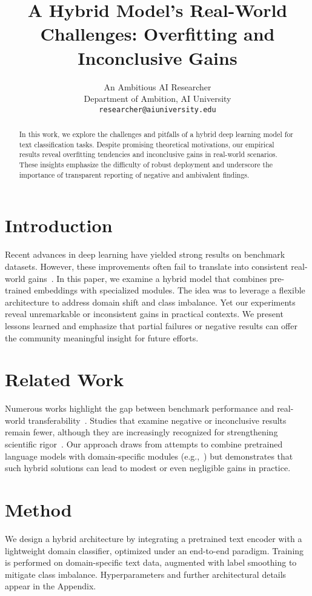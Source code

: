 \documentclass{article}
\title{A Hybrid Model's Real-World Challenges:
Overfitting and Inconclusive Gains}
\author{
  An Ambitious AI Researcher \\
  Department of Ambition, AI University \\
  \texttt{researcher@aiuniversity.edu}
}
\date{}
\begin{document}
\maketitle

\begin{abstract}
In this work, we explore the challenges and pitfalls of a hybrid deep learning model for text classification tasks. Despite promising theoretical motivations, our empirical results reveal overfitting tendencies and inconclusive gains in real-world scenarios. These insights emphasize the difficulty of robust deployment and underscore the importance of transparent reporting of negative and ambivalent findings.
\end{abstract}

\section{Introduction}
Recent advances in deep learning have yielded strong results on benchmark datasets. However, these improvements often fail to translate into consistent real-world gains~\cite{brown2020language,vaswani2017attention}. In this paper, we examine a hybrid model that combines pre-trained embeddings with specialized modules. The idea was to leverage a flexible architecture to address domain shift and class imbalance. Yet our experiments reveal unremarkable or inconsistent gains in practical contexts. We present lessons learned and emphasize that partial failures or negative results can offer the community meaningful insight for future efforts.

\section{Related Work}
Numerous works highlight the gap between benchmark performance and real-world transferability~\cite{devlin2019bert, he2016deep}. Studies that examine negative or inconclusive results remain fewer, although they are increasingly recognized for strengthening scientific rigor~\cite{henderson2018deep}. Our approach draws from attempts to combine pretrained language models with domain-specific modules (e.g.,~\cite{peters2018deep}) but demonstrates that such hybrid solutions can lead to modest or even negligible gains in practice.

\section{Method}
We design a hybrid architecture by integrating a pretrained text encoder with a lightweight domain classifier, optimized under an end-to-end paradigm. Training is performed on domain-specific text data, augmented with label smoothing to mitigate class imbalance. Hyperparameters and further architectural details appear in the Appendix.
\end{document}
